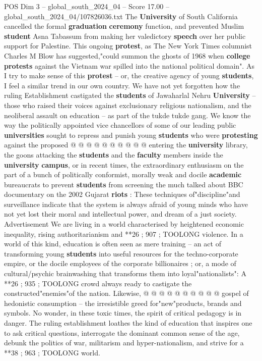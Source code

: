 \begin{textsample}{POS Dim 3 – global\_south\_2024\_04 – Score 17.00 – global\_south\_2024\_04/107826036.txt}
The \textbf{University} of South California cancelled the formal \textbf{graduation} \textbf{ceremony} function, and prevented Muslim \textbf{student} Asna Tabassum from making her valedictory \textbf{speech} over her public support for Palestine.
This ongoing \textbf{protest}, as The New York Times columnist Charles M Blow has suggested,"could summon the ghosts of 1968 when \textbf{college} \textbf{protests} against the Vietnam war spilled into the national political domain".
As I try to make sense of this \textbf{protest} -- or, the creative agency of young \textbf{students}, I feel a similar trend in our own country.
We have not yet forgotten how the ruling Establishment castigated the \textbf{students} of Jawaharlal Nehru \textbf{University} -- those who raised their voices against exclusionary religious nationalism, and the neoliberal assault on education -- as part of the tukde tukde gang.
We know the way the politically appointed vice chancellors of some of our leading public \textbf{universities} sought to repress and punish young \textbf{students} who were \textbf{protesting} against the proposed @ @ @ @ @ @ @ @ @ @ entering the \textbf{university} library, the goons attacking the \textbf{students} and the \textbf{faculty} members inside the \textbf{university} \textbf{campus}, or in recent times, the extraordinary enthusiasm on the part of a bunch of politically conformist, morally weak and docile \textbf{academic} bureaucrats to prevent \textbf{students} from screening the much talked about BBC documentary on the 2002 Gujarat \textbf{riots} : These techniques of"discipline"and surveillance indicate that the system is always afraid of young minds who have not yet lost their moral and intellectual power, and dream of a just society.
Advertisement We are living in a world characterised by heightened economic inequality, rising authoritarianism and **26 ; 907 ; TOOLONG violence.
In a world of this kind, education is often seen as mere training -- an act of transforming young \textbf{students} into useful resources for the techno-corporate empire, or the docile employees of the corporate billionaires ; or, a mode of cultural/psychic brainwashing that transforms them into loyal"nationalists": A **26 ; 935 ; TOOLONG crowd always ready to castigate the constructed"enemies"of the nation.
Likewise, @ @ @ @ @ @ @ @ @ @ gospel of hedonistic consumption -- the irresistible greed for"new"products, brands and symbols.
No wonder, in these toxic times, the spirit of critical pedagogy is in danger.
The ruling establishment loathes the kind of education that inspires one to ask critical questions, interrogate the dominant common sense of the age, debunk the politics of war, militarism and hyper-nationalism, and strive for a **38 ; 963 ; TOOLONG world.

\end{textsample}
